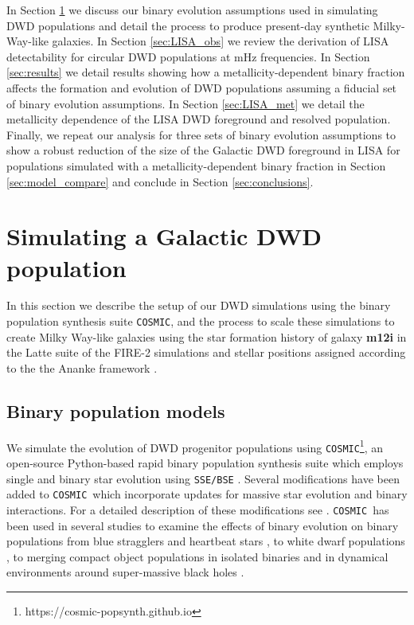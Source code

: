\documentclass[twocolumn, linenumbers]{aastex631}
\newcommand{\cosmic}{\texttt{COSMIC}}
\begin{document}
In Section \ref{sec:simulations} we discuss our binary evolution assumptions used in simulating DWD populations and detail the process to produce present-day synthetic Milky-Way-like galaxies. In Section \ref{sec:LISA_obs} we review the derivation of LISA detectability for circular DWD populations at mHz frequencies. In Section \ref{sec:results} we detail results showing how a metallicity-dependent binary fraction affects the formation and evolution of DWD populations assuming a fiducial set of binary evolution assumptions. In Section \ref{sec:LISA_met} we detail the metallicity dependence of the LISA DWD foreground and resolved population. Finally, we repeat our analysis for three sets of binary evolution assumptions to show a robust reduction of the size of the Galactic DWD foreground in LISA for populations simulated with a metallicity-dependent binary fraction in Section \ref{sec:model_compare} and conclude in Section \ref{sec:conclusions}.  

\section{Simulating a Galactic DWD population}\label{sec:simulations}
In this section we describe the setup of our DWD simulations using the binary population synthesis suite \cosmic, and the process to scale these simulations to create Milky Way-like galaxies using the star formation history of galaxy \textbf{\textbf{m12i}} in the Latte suite of the FIRE-2 simulations \citep{Wetzel2016, Hopkins2018} and stellar positions assigned according to the the Ananke framework \citep{Sanderson2020}. 


\subsection{Binary population models}
\label{sec:bin_pop}
We simulate the evolution of DWD progenitor populations using \cosmic\footnote{https://cosmic-popsynth.github.io}, an open-source Python-based rapid binary population synthesis suite which employs single and binary star evolution using \texttt{SSE/BSE} \citep{Hurley2000, Hurley2002}. Several modifications have been added to \cosmic\ which incorporate updates for massive star evolution and binary interactions. For a detailed description of these modifications see \citet{Breivik2020a}. \cosmic\ has been used in several studies to examine the effects of binary evolution on binary populations from blue stragglers \citep{Leiner2021} and heartbeat stars \citep{Jayasinghe2021}, to white dwarf populations \citep{Kremer2017,Breivik2018,Kilic2021}, to merging compact object populations in isolated binaries \citep{Zevin2020b, Zevin2020a, Zevin2021, Wong2021, Mandhai2021} and in dynamical environments around super-massive black holes \citep{Stephan2019, Wang2021}. 
\end{document}
